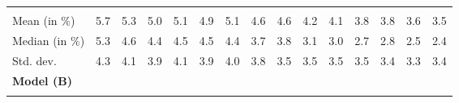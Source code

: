 \begin{tabular}{lllllllllllllll}
  \multicolumn{1}{|r}{} &
  \multicolumn{1}{r}{} &
  \multicolumn{1}{r}{} &
  \multicolumn{1}{r}{} &
  \multicolumn{1}{r}{} &
  \multicolumn{1}{r}{} &
  \multicolumn{1}{r}{} &
  \multicolumn{1}{r}{} &
  \multicolumn{1}{r}{} &
  \multicolumn{1}{r}{} &
  \multicolumn{1}{r}{} &
  \multicolumn{1}{r}{} &
  \multicolumn{1}{r}{} &
  \multicolumn{1}{r}{} \\
\multicolumn{1}{l}{\hspace{2em}Mean (in $\%$)} &
  \multicolumn{1}{|r}{5.7} &
  \multicolumn{1}{r}{5.3} &
  \multicolumn{1}{r}{5.0} &
  \multicolumn{1}{r}{5.1} &
  \multicolumn{1}{r}{4.9} &
  \multicolumn{1}{r}{5.1} &
  \multicolumn{1}{r}{4.6} &
  \multicolumn{1}{r}{4.6} &
  \multicolumn{1}{r}{4.2} &
  \multicolumn{1}{r}{4.1} &
  \multicolumn{1}{r}{3.8} &
  \multicolumn{1}{r}{3.8} &
  \multicolumn{1}{r}{3.6} &
  \multicolumn{1}{r}{3.5} \\
\multicolumn{1}{l}{\hspace{2em}Median (in $\%$)} &
  \multicolumn{1}{|r}{5.3} &
  \multicolumn{1}{r}{4.6} &
  \multicolumn{1}{r}{4.4} &
  \multicolumn{1}{r}{4.5} &
  \multicolumn{1}{r}{4.5} &
  \multicolumn{1}{r}{4.4} &
  \multicolumn{1}{r}{3.7} &
  \multicolumn{1}{r}{3.8} &
  \multicolumn{1}{r}{3.1} &
  \multicolumn{1}{r}{3.0} &
  \multicolumn{1}{r}{2.7} &
  \multicolumn{1}{r}{2.8} &
  \multicolumn{1}{r}{2.5} &
  \multicolumn{1}{r}{2.4} \\
\multicolumn{1}{l}{\hspace{2em}Std. dev.} &
  \multicolumn{1}{|r}{4.3} &
  \multicolumn{1}{r}{4.1} &
  \multicolumn{1}{r}{3.9} &
  \multicolumn{1}{r}{4.1} &
  \multicolumn{1}{r}{3.9} &
  \multicolumn{1}{r}{4.0} &
  \multicolumn{1}{r}{3.8} &
  \multicolumn{1}{r}{3.5} &
  \multicolumn{1}{r}{3.5} &
  \multicolumn{1}{r}{3.5} &
  \multicolumn{1}{r}{3.5} &
  \multicolumn{1}{r}{3.4} &
  \multicolumn{1}{r}{3.3} &
  \multicolumn{1}{r}{3.4} \\
\multicolumn{1}{l}{{\textbf{Model (B)}}} &
  \multicolumn{1}{|r}{} &
  \multicolumn{1}{r}{} &
  \multicolumn{1}{r}{} &
  \multicolumn{1}{r}{} &
  \multicolumn{1}{r}{} &
  \multicolumn{1}{r}{} &
  \multicolumn{1}{r}{} &
  \multicolumn{1}{r}{} &
  \multicolumn{1}{r}{} &
  \multicolumn{1}{r}{} &
  \multicolumn{1}{r}{} &
  \multicolumn{1}{r}{} &
  \multicolumn{1}{r}{} &
  \multicolumn{1}{r}{} \\
\multicolumn{1}{l}{\hspace{1em}{\textit{Mult. term} ($\widehat{\tau}^{adv}$)}} &
  \multicolumn{1}{|r}{} &
  \multicolumn{1}{r}{} &
  \multicolumn{1}{r}{} &
  \multicolumn{1}{r}{} &

\end{tabular}
